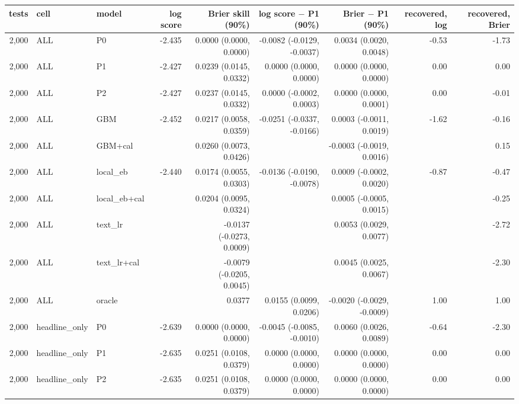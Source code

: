 \begin{tabular}{rllrrrrrr}
\toprule
tests & cell & model & log score & Brier skill (90\%) & log score $-$ P1 (90\%) & Brier $-$ P1 (90\%) & recovered, log & recovered, Brier \\
\midrule
2,000 & ALL & P0 & -2.435 & 0.0000 (0.0000, 0.0000) & -0.0082 (-0.0129, -0.0037) & 0.0034 (0.0020, 0.0048) & -0.53 & -1.73 \\
2,000 & ALL & P1 & -2.427 & 0.0239 (0.0145, 0.0332) & 0.0000 (0.0000, 0.0000) & 0.0000 (0.0000, 0.0000) & 0.00 & 0.00 \\
2,000 & ALL & P2 & -2.427 & 0.0237 (0.0145, 0.0332) & 0.0000 (-0.0002, 0.0003) & 0.0000 (0.0000, 0.0001) & 0.00 & -0.01 \\
2,000 & ALL & GBM & -2.452 & 0.0217 (0.0058, 0.0359) & -0.0251 (-0.0337, -0.0166) & 0.0003 (-0.0011, 0.0019) & -1.62 & -0.16 \\
2,000 & ALL & GBM+cal &  & 0.0260 (0.0073, 0.0426) &  & -0.0003 (-0.0019, 0.0016) &  & 0.15 \\
2,000 & ALL & local\_eb & -2.440 & 0.0174 (0.0055, 0.0303) & -0.0136 (-0.0190, -0.0078) & 0.0009 (-0.0002, 0.0020) & -0.87 & -0.47 \\
2,000 & ALL & local\_eb+cal &  & 0.0204 (0.0095, 0.0324) &  & 0.0005 (-0.0005, 0.0015) &  & -0.25 \\
2,000 & ALL & text\_lr &  & -0.0137 (-0.0273, 0.0009) &  & 0.0053 (0.0029, 0.0077) &  & -2.72 \\
2,000 & ALL & text\_lr+cal &  & -0.0079 (-0.0205, 0.0045) &  & 0.0045 (0.0025, 0.0067) &  & -2.30 \\
2,000 & ALL & oracle & & 0.0377 & 0.0155 (0.0099, 0.0206) & -0.0020 (-0.0029, -0.0009) & 1.00 & 1.00 \\
2,000 & headline\_only & P0 & -2.639 & 0.0000 (0.0000, 0.0000) & -0.0045 (-0.0085, -0.0010) & 0.0060 (0.0026, 0.0089) & -0.64 & -2.30 \\
2,000 & headline\_only & P1 & -2.635 & 0.0251 (0.0108, 0.0379) & 0.0000 (0.0000, 0.0000) & 0.0000 (0.0000, 0.0000) & 0.00 & 0.00 \\
2,000 & headline\_only & P2 & -2.635 & 0.0251 (0.0108, 0.0379) & 0.0000 (0.0000, 0.0000) & 0.0000 (0.0000, 0.0000) & 0.00 & 0.00 \\

\end{tabular}
